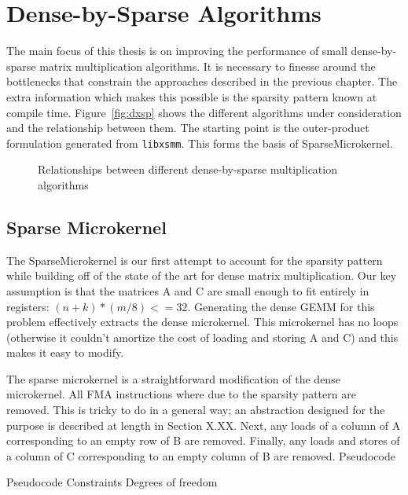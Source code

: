 \chapter{Dense-by-Sparse Algorithms}
\label{chapter:algs}

The main focus of this thesis is on improving the performance of small dense-by-sparse matrix multiplication algorithms. It is necessary to finesse around the bottlenecks that constrain the approaches described in the previous chapter. The extra information which makes this possible is the sparsity pattern known at compile time. Figure~\ref{fig:dxsp} shows the different algorithms under consideration and the relationship between them. The starting point is the outer-product formulation generated from \texttt{libxsmm}. This forms the basis of SparseMicrokernel. 


\begin{figure}[H]
  \centering
  
  \label{fig:dxspfamilies}
  \caption{Relationships between different dense-by-sparse multiplication algorithms}
\end{figure}





\section{Sparse Microkernel}

The SparseMicrokernel is our first attempt to account for the sparsity pattern while building off of the state of the art for dense matrix multiplication. Our key assumption is that the matrices A and C are small enough to fit entirely in registers: $(n + k) * (m/8) <= 32$. Generating the dense GEMM for this problem effectively extracts the dense microkernel. This microkernel has no loops (otherwise it couldn't amortize the cost of loading and storing A and C) and this makes it easy to modify.

The sparse microkernel is a straightforward modification of the dense microkernel. All FMA instructions  where  due to the sparsity pattern are removed. This is tricky to do in a general way; an abstraction designed for the purpose is described at length in Section X.XX. Next, any loads of a column of A corresponding to an empty row of B are removed. Finally, any loads and stores of a column of C corresponding to an empty column of B are removed. Pseudocode

Pseudocode
Constraints
Degrees of freedom


